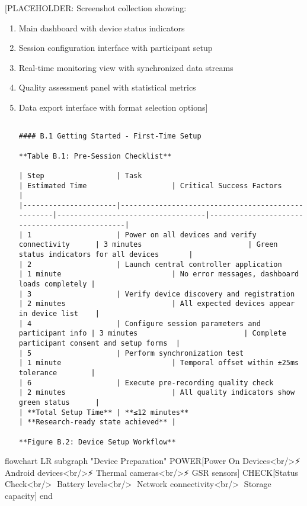 \documentclass[11pt,a4paper]{report}
\begin{document}
\begin{verbatim}
\end{verbatim}
[PLACEHOLDER: Screenshot collection showing:
\begin{enumerate}
\item Main dashboard with device status indicators
\item Session configuration interface with participant setup
\item Real-time monitoring view with synchronized data streams
\item Quality assessment panel with statistical metrics
\item Data export interface with format selection options]
\begin{verbatim}

#### B.1 Getting Started - First-Time Setup

**Table B.1: Pre-Session Checklist**

| Step                 | Task                                              | Estimated Time                    | Critical Success Factors                      |
|----------------------|---------------------------------------------------|-----------------------------------|-----------------------------------------------|
| 1                    | Power on all devices and verify connectivity      | 3 minutes                         | Green status indicators for all devices       |
| 2                    | Launch central controller application             | 1 minute                          | No error messages, dashboard loads completely |
| 3                    | Verify device discovery and registration          | 2 minutes                         | All expected devices appear in device list    |
| 4                    | Configure session parameters and participant info | 3 minutes                         | Complete participant consent and setup forms  |
| 5                    | Perform synchronization test                      | 1 minute                          | Temporal offset within ±25ms tolerance        |
| 6                    | Execute pre-recording quality check               | 2 minutes                         | All quality indicators show green status      |
| **Total Setup Time** | **≤12 minutes**                                   | **Research-ready state achieved** |

**Figure B.2: Device Setup Workflow**

\end{verbatim}
\end{enumerate}
flowchart LR
subgraph "Device Preparation"
POWER[Power On Devices<br/>⚡ Android devices<br/>⚡ Thermal cameras<br/>⚡ GSR sensors]
CHECK[Status Check<br/>📱 Battery levels<br/>📶 Network connectivity<br/>💾 Storage capacity]
end
\end{document}
